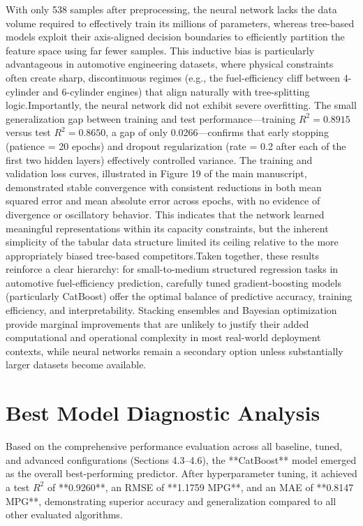 With only 538 samples after preprocessing, the neural network lacks the data volume required to effectively train its millions of parameters, whereas tree-based models exploit their axis-aligned decision boundaries to efficiently partition the feature space using far fewer samples. This inductive bias is particularly advantageous in automotive engineering datasets, where physical constraints often create sharp, discontinuous regimes (e.g., the fuel-efficiency cliff between 4-cylinder and 6-cylinder engines) that align naturally with tree-splitting logic.Importantly, the neural network did not exhibit severe overfitting. The small generalization gap between training and test performance—training \(R^2 = 0.8915\) versus test \(R^2 = 0.8650\), a gap of only 0.0266—confirms that early stopping (patience = 20 epochs) and dropout regularization (rate = 0.2 after each of the first two hidden layers) effectively controlled variance. The training and validation loss curves, illustrated in Figure 19 of the main manuscript, demonstrated stable convergence with consistent reductions in both mean squared error and mean absolute error across epochs, with no evidence of divergence or oscillatory behavior. This indicates that the network learned meaningful representations within its capacity constraints, but the inherent simplicity of the tabular data structure limited its ceiling relative to the more appropriately biased tree-based competitors.Taken together, these results reinforce a clear hierarchy: for small-to-medium structured regression tasks in automotive fuel-efficiency prediction, carefully tuned gradient-boosting models (particularly CatBoost) offer the optimal balance of predictive accuracy, training efficiency, and interpretability. Stacking ensembles and Bayesian optimization provide marginal improvements that are unlikely to justify their added computational and operational complexity in most real-world deployment contexts, while neural networks remain a secondary option unless substantially larger datasets become available.


\section{Best Model Diagnostic Analysis}

Based on the comprehensive performance evaluation across all baseline, tuned, and advanced configurations (Sections 4.3–4.6), the **CatBoost** model emerged as the overall best-performing predictor. After hyperparameter tuning, it achieved a test \(R^2\) of **0.9260**, an RMSE of **1.1759 MPG**, and an MAE of **0.8147 MPG**, demonstrating superior accuracy and generalization compared to all other evaluated algorithms.


